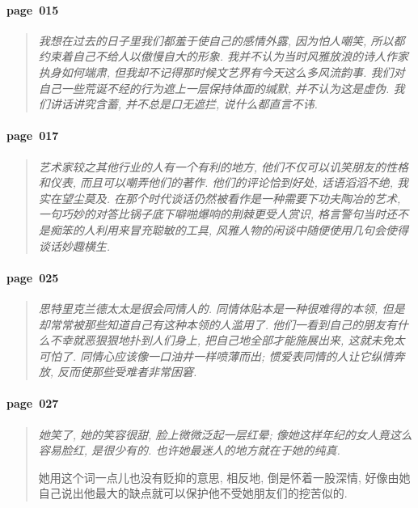 \paragraph*{page~015}
\begin{quotation}
    \itshape
    我想在过去的日子里我们都羞于使自己的感情外露, 因为怕人嘲笑, 所以都约束着自己不给人以傲慢自大的形象. 我并不认为当时风雅放浪的诗人作家执身如何端肃, 但我却不记得那时候文艺界有今天这么多风流韵事. 我们对自己一些荒诞不经的行为遮上一层保持体面的缄默, 并不认为这是虚伪. 我们讲话讲究含蓄, 并不总是口无遮拦, 说什么都直言不讳.
\end{quotation}

\paragraph*{page~017}
\begin{quotation}
    \itshape
    艺术家较之其他行业的人有一个有利的地方, 他们不仅可以讥笑朋友的性格和仪表, 而且可以嘲弄他们的著作. 他们的评论恰到好处, 话语滔滔不绝, 我实在望尘莫及. 在那个时代谈话仍然被看作是一种需要下功夫陶冶的艺术, 一句巧妙的对答比锅子底下噼啪爆响的荆棘更受人赏识, 格言警句当时还不是痴笨的人利用来冒充聪敏的工具, 风雅人物的闲谈中随便使用几句会使得谈话妙趣横生. 
\end{quotation}

\paragraph*{page~025}
\begin{quotation}
    \itshape
    思特里克兰德太太是很会同情人的. 同情体贴本是一种很难得的本领, 但是却常常被那些知道自己有这种本领的人滥用了. 他们一看到自己的朋友有什么不幸就恶狠狠地扑到人们身上, 把自己地全部才能施展出来, 这就未免太可怕了. 同情心应该像一口油井一样喷薄而出; 惯爱表同情的人让它纵情奔放, 反而使那些受难者非常困窘. 
\end{quotation}

\paragraph*{page~027}
\begin{quotation}
    \itshape
    她笑了, 她的笑容很甜, 脸上微微泛起一层红晕; 像她这样年纪的女人竟这么容易脸红, 是很少有的. 也许她最迷人的地方就在于她的纯真.

    她用这个词一点儿也没有贬抑的意思, 相反地, 倒是怀着一股深情, 好像由她自己说出他最大的缺点就可以保护他不受她朋友们的挖苦似的.
\end{quotation}


